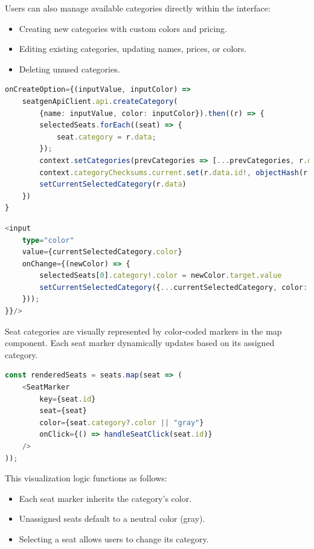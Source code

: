 Users can also manage available categories directly within the interface:
\begin{itemize}
    \item Creating new categories with custom colors and pricing.
    \item Editing existing categories, updating names, prices, or colors.
    \item Deleting unused categories.
\end{itemize}

\begin{lstlisting}[language=TypeScript, caption=Managing Categories, label=lst:manage-categories]
onCreateOption={(inputValue, inputColor) =>
    seatgenApiClient.api.createCategory(
        {name: inputValue, color: inputColor}).then((r) => {
        selectedSeats.forEach((seat) => {
            seat.category = r.data;
        });
        context.setCategories(prevCategories => [...prevCategories, r.data]);
        context.categoryChecksums.current.set(r.data.id!, objectHash(r.data))
        setCurrentSelectedCategory(r.data)
    })
}
\end{lstlisting}

\begin{lstlisting}[language=TypeScript, caption=Managing Category Color, label=lst:manage-categories]
<input 
    type="color"
    value={currentSelectedCategory.color}
    onChange={(newColor) => {
        selectedSeats[0].category!.color = newColor.target.value
        setCurrentSelectedCategory({...currentSelectedCategory, color: newColor.target.value})
    }));
}}/>
\end{lstlisting}

Seat categories are visually represented by color-coded markers in the map component. Each seat marker dynamically updates based on its assigned category.

\begin{lstlisting}[language=TypeScript, caption=Rendering Seat Markers with Categories, label=lst:render-seat-category]
const renderedSeats = seats.map(seat => (
    <SeatMarker 
        key={seat.id} 
        seat={seat} 
        color={seat.category?.color || "gray"} 
        onClick={() => handleSeatClick(seat.id)}
    />
));
\end{lstlisting}

This visualization logic functions as follows:
\begin{itemize}
    \item Each seat marker inherits the category's color.
    \item Unassigned seats default to a neutral color (gray).
    \item Selecting a seat allows users to change its category.
\end{itemize}

